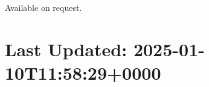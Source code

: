 \documentclass[line]{resume}
\begin{document}
\begin{resume}
    Available on request.

    \section{\mysidestyle Last Updated: 2025-01-10T11:58:29+0000}

\end{resume}
\end{document}
